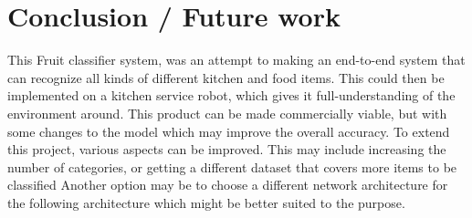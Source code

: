 \documentclass[10pt,journal,compsoc]{IEEEtran}
\begin{document}
\section{Conclusion / Future work}
This Fruit classifier system, was an attempt to making an end-to-end system that can recognize all kinds of different kitchen and food items. This could then be implemented on a kitchen service robot, which gives it full-understanding of the environment around. This product can be made commercially viable, but with some changes to the model which may improve the overall accuracy. To extend this project, various aspects can be improved. This may include increasing the number of categories, or getting a different dataset that covers more items to be classified Another option may be to choose a different network architecture for the following architecture which might be better suited to the purpose. 




\end{document}
